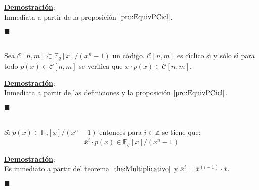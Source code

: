 \underline{\textbf{Demostraci\'on}}:\\
Inmediata a partir de la proposici\'on $\ref{pro:EquivPCicl}$.
\begin{flushright}
$\blacksquare$
\end{flushright}
%
\begin{teorema}\label{the:Multiplicativo}
\ \\
Sea $\mathcal{C}[n,m]\subset \mathbb{F}_q[x]/(x^n-1)$ un c\'odigo.
$\mathcal{C}[n,m]$ es c\'{\i}clico s\'{\i} y s\'olo s\'{\i} para todo
$\overline{p(x)}\in \mathcal{C}[n,m]$ se verifica que
$\overline{x}\cdot\overline{p(x)}\in \mathcal{C}[n,m]$.
\end{teorema}
\underline{\textbf{Demostraci\'on}}:\\
Inmediata a partir de las definiciones y la proposici\'on
$\ref{pro:EquivPCicl}$.
\begin{flushright}
$\blacksquare$
\end{flushright}
%
\begin{corolario}
\ \\
S\'{\i} $\overline{p(x)}\in \mathbb{F}_q[x]/(x^n-1)$
entonces para $i\in \mathbb{Z}$ se tiene que:
\begin{displaymath}
\overline{x}^i\cdot \overline{p(x)}\in \mathbb{F}_q[x]/(x^n-1)
\end{displaymath}
\end{corolario}
\underline{\textbf{Demostraci\'on}}:\\
Es inmediato a partir del teorema $\ref{the:Multiplicativo}$ y
$\overline{x}^i=\overline{x}^{(i-1)}\cdot \overline{x}$.
\begin{flushright}
$\blacksquare$
\end{flushright}
